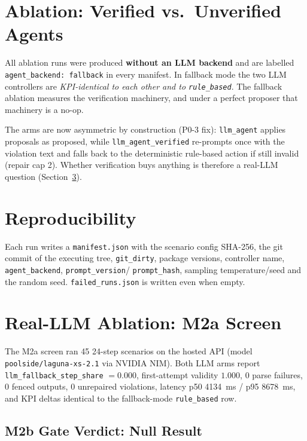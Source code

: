 \section{Ablation: Verified vs.\ Unverified Agents}\label{sec:ablation}

All ablation runs were produced \textbf{without an LLM backend} and are
labelled \texttt{agent\_backend: fallback} in every manifest. In fallback mode
the two LLM controllers are \emph{KPI-identical to each other and to
\texttt{rule\_based}}. The fallback ablation measures the verification
machinery, and under a perfect proposer that machinery is a no-op.

The arms are now asymmetric by construction (P0-3 fix): \texttt{llm\_agent}
applies proposals as proposed, while \texttt{llm\_agent\_verified} re-prompts
once with the violation text and falls back to the deterministic rule-based
action if still invalid (repair cap 2). Whether verification buys anything is
therefore a real-LLM question (Section~\ref{sec:m2a}).

\section{Reproducibility}\label{sec:repro}

Each run writes a \texttt{manifest.json} with the scenario config SHA-256, the
git commit of the executing tree, \texttt{git\_dirty}, package versions,
controller name, \texttt{agent\_backend}, \texttt{prompt\_version}/%
\texttt{prompt\_hash}, sampling temperature/seed and the random seed.
\texttt{failed\_runs.json} is written even when empty.

\section{Real-LLM Ablation: M2a Screen}\label{sec:m2a}

The M2a screen ran 45 24-step scenarios on the hosted API (model
\texttt{poolside/laguna-xs-2.1} via NVIDIA NIM). Both LLM arms report
\texttt{llm\_fallback\_step\_share} $= 0.000$, first-attempt validity $1.000$,
0 parse failures, 0 fenced outputs, 0 unrepaired violations, latency
p50 4134~ms / p95 8678~ms, and KPI deltas identical to the fallback-mode
\texttt{rule\_based} row.

\subsection{M2b Gate Verdict: Null Result}

